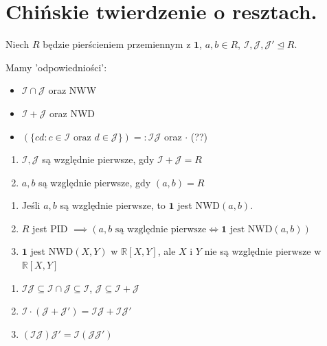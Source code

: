 \section{Chińskie twierdzenie o resztach.}
Niech $R$ będzie pierścieniem przemiennym z $\mathbf{1}$, $a,b \in R$, $\mathcal{I},\mathcal{J},\mathcal{J}' \unlhd R$.

Mamy 'odpowiedniości':
\begin{itemize}
	\item $\mathcal{I}\cap \mathcal{J}$ oraz NWW
	\item $\mathcal{I}+ \mathcal{J}$ oraz NWD
	\item $\left( \{cd: c\in \mathcal{I} \text{ oraz } d\in \mathcal{J}\}  \right) =: \mathcal{I}\mathcal{J}$ oraz $\cdot $ (??)
\end{itemize}
\begin{definition}
	\begin{enumerate}[label=\arabic*)]
		\item $\mathcal{I},\mathcal{J}$ są względnie pierwsze, gdy $\mathcal{I}+\mathcal{J} = R$
		\item $a,b$ są względnie pierwsze, gdy $\left( a,b \right) = R$
	\end{enumerate}
\end{definition} 
\begin{remark}
	\begin{enumerate}[label=\arabic*)]
		\item Jeśli $a,b$ są względnie pierwsze, to $\mathbf{1}$ jest $\text{NWD}\left( a,b \right) $.
		\item $R$ jest PID $\implies \left( a,b \text{ są względnie pierwsze} \iff \mathbf{1} \text{ jest } \text{NWD}\left( a,b \right)  \right)$ 
		\item $\mathbf{1}$ jest $\text{NWD}\left( X,Y \right) $ w $\mathbb{R} \left[ X,Y \right] $, ale $X$ i $Y$ nie są względnie pierwsze w $\mathbb{R} \left[ X,Y \right] $
	\end{enumerate}
\end{remark} 
\begin{lemma}
	\begin{enumerate}[label=\arabic*)]
		\item $\mathcal{I}\mathcal{J} \subseteq \mathcal{I} \cap \mathcal{J} \subseteq \mathcal{I}$,  $\mathcal{J}\subseteq \mathcal{I}+\mathcal{J}$ 
		\item $\mathcal{I}\cdot \left( \mathcal{J}+ \mathcal{J}' \right) = \mathcal{I}\mathcal{J}+ \mathcal{I}\mathcal{J}'$
		\item $\left( \mathcal{I}\mathcal{J} \right) \mathcal{J}' = \mathcal{I}\left( \mathcal{J}\mathcal{J}' \right) $
	\end{enumerate}
\end{lemma} 
